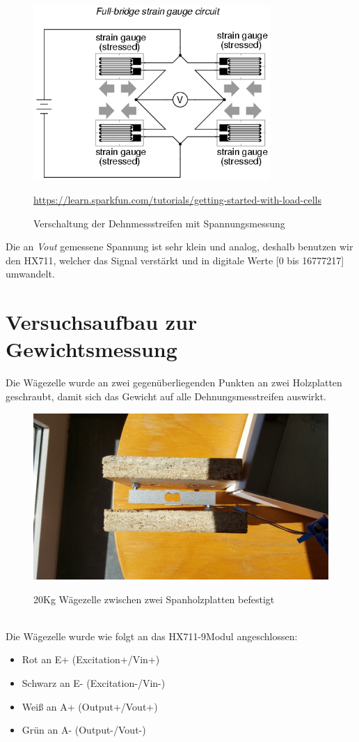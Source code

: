 \begin{figure}[ht]
    \center
    \includegraphics[width=9cm]{Bilder/waegezelle-full.png}\\
    \caption{Verschaltung der Dehnmessstreifen mit Spannungsmessung}
    \begin{flushleft} \quelle\url{https://learn.sparkfun.com/tutorials/getting-started-with-load-cells} \end{flushleft}
\end{figure}
Die an \textit{Vout} gemessene Spannung ist sehr klein und analog, deshalb benutzen wir den HX711, welcher das Signal verstärkt und in digitale Werte [0 bis 16777217] umwandelt. 
\newpage


\section{Versuchsaufbau zur Gewichtsmessung}
Die Wägezelle wurde an zwei gegenüberliegenden Punkten an zwei Holzplatten geschraubt, damit sich das Gewicht auf alle Dehnungsmesstreifen auswirkt.\\
\begin{figure}[ht]
    \center
    \includegraphics[width=15cm]{Bilder/waegezelle.jpg}\\
    \caption{20Kg Wägezelle zwischen zwei Spanholzplatten befestigt}
\end{figure}\\
Die Wägezelle wurde wie folgt an das HX711-9Modul angeschlossen: 
\begin{itemize}
    \item Rot an E+ (Excitation+/Vin+) 
    \item Schwarz an E- (Excitation-/Vin-) 
    \item Weiß an A+ (Output+/Vout+) 
    \item Grün an A- (Output-/Vout-) 
\end{itemize}

